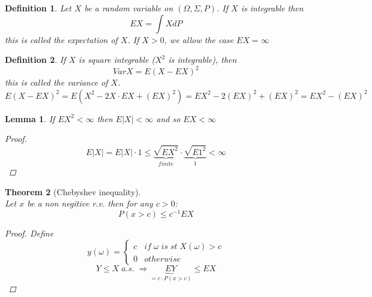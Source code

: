 \documentclass[12pt]{article}
\newtheorem{theorem}{Theorem}[section]
\newtheorem{lemma}[theorem]{Lemma}
\newtheorem{definition}{Definition}[section]
\begin{document}
\begin{definition}
Let $X$ be a random variable on $(\Omega , \Sigma , P)$. If $X$ is integrable then \[EX = \int X dP \]
this is called the expectation of $X$. If $X >0$, we allow the case $EX = \infty$
\end{definition}
\begin{definition}
 If $X$ is square integrable ($X^2$ is integrable), then \[VarX =E (X - EX)^2 \]
this is called the variance of $X$. 
\[E (X - EX)^2 = E (X^2 -2X\cdot EX + (EX)^2) = EX^2 -2( EX)^2 + (EX)^2 = EX^2 -( EX)^2\]
\end{definition}

\begin{lemma}If $EX^2< \infty$ then $E|X|<\infty$ and so $EX < \infty$
\begin{proof}
\[E|X| = E|X|\cdot 1 \leq \underbrace{\sqrt{EX^2}}_{finite} \cdot \underbrace{\sqrt{E1^2}}_{1} < \infty\]
\end{proof}
\end{lemma}

\begin{theorem}[Chebyshev inequality] \quad\\
Let $x$ be a non negitive r.v. then for any $c>0$:
\[P(x>c) \leq c^{-1}EX\]
\begin{proof}
Define \[y(\omega) = \begin{cases} c & if \; \omega \;  is \; st \;X(\omega)>c\\
0 & otherwise \end{cases} \]
\[Y\leq X \; a.s.\; \Rightarrow \underbrace{EY}_{ = c\cdot P(x>c)} \leq EX\]
\end{proof}
\end{theorem} 
\end{document}
